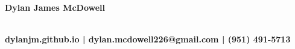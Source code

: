 \documentclass[letterpaper]{deedy-resume}
\begin{document}
\begin{flushleft}
  \Huge \textbf{Dylan James McDowell}\\
  \begin{small}
    \vspace{-10mm}
    \textbf{\\dylanjm.github.io | dylan.mcdowell226@gmail.com | (951) 491-5713}
  \end{small}
\end{flushleft}


\vspace{-3mm}
\hspace{-6.5mm}
\end{document}
